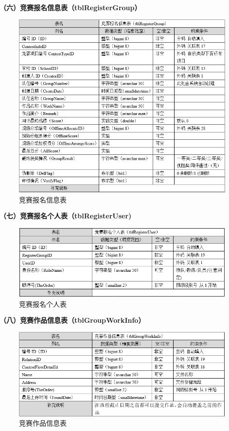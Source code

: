 \documentclass[a4paper]{ltxdoc}
\begin{document}
{		\textbf{（六）竞赛报名信息表（tblRegisterGroup）}
		\begin{figure}[H]
			\centering
			\includegraphics[width=1.0\linewidth]{images/dbtable/tblRegisterGroup.png}
			\caption{竞赛报名信息表}
		\end{figure}
		
		\textbf{（七）竞赛报名个人表（tblRegisterUser)}
		\begin{figure}[H]
			\centering
			\includegraphics[width=1.0\linewidth]{images/dbtable/tblRegisterUser.png}
			\caption{竞赛报名个人表}
		\end{figure}
		
		\textbf{（八）竞赛作品信息表（tblGroupWorkInfo）}
		\begin{figure}[H]
			\centering
			\includegraphics[width=1.0\linewidth]{images/dbtable/tblGroupWorkInfo.png}
			\caption{竞赛作品信息表}
		\end{figure}
		
}
\end{document}
